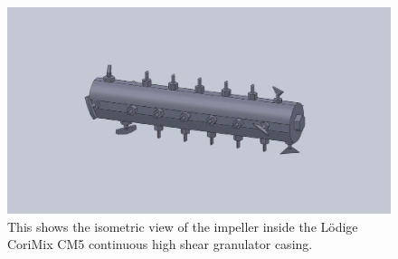 \documentclass[preprint,11pt,authoryear]{elsarticle}
\begin{document}
\begin{figure}
\centering
\includegraphics[scale=0.15]{impeller_final_pic.pdf}
\caption{This shows the isometric view of the impeller inside the L\"{o}dige CoriMix CM5 continuous 
high shear granulator casing.}
\label{fig:mthds_dem_charles_impeller}
\end{figure}    
\end{document}
